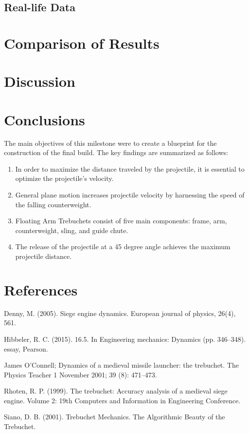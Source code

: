 \documentclass[12pt, titlepage]{article}
\begin{document}
    \subsection{Real-life Data}

    \newpage
    \section{Comparison of Results}
    \newpage
    \section{Discussion}
    \newpage
    \section{Conclusions}
    The main objectives of this milestone were to create a blueprint for 
    the construction of the final build.
    The key findings are summarized as follows:
    \begin{enumerate}
        \item In order to maximize the distance traveled by the projectile, it is essential to optimize the projectile's velocity. 
        \item General plane motion increases projectile velocity by harnessing the speed of the falling counterweight.    
        \item Floating Arm Trebuchets consist of five main components: 
            frame, arm, counterweight, sling, and guide chute.
        \item The release of the projectile at a 45 degree angle achieves the 
            maximum projectile distance.
    \end{enumerate}
    \newpage
    \section{References}
        \hspace{15pt}Denny, M. (2005). Siege engine dynamics. European journal of physics, 26(4), 561.

        Hibbeler, R. C. (2015). 16.5. In Engineering mechanics: Dynamics (pp. 346–348). essay, Pearson.
        
        James O'Connell; Dynamics of a medieval missile launcher: the trebuchet. The Physics Teacher 1 November 2001; 39 (8): 471–473.

        Rhoten, R. P. (1999). The trebuchet: Accuracy analysis of a medieval siege engine. Volume 2: 19th Computers and Information in Engineering Conference.

        Siano, D. B. (2001). Trebuchet Mechanics. The Algorithmic Beauty of the Trebuchet.
\end{document}
